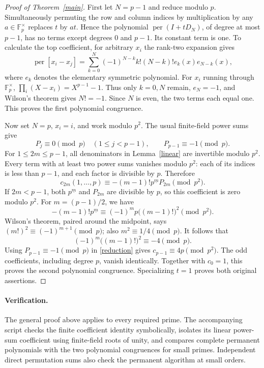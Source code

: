 \documentclass[10pt]{article}
\newcommand{\per}{\operatorname{per}}
\newcommand{\fall}[2]{#1^{\underline{#2}}}
\begin{document}
\begin{proof}[Proof of Theorem~\ref{main}]
First let \(N=p-1\) and reduce modulo \(p\).
Simultaneously permuting the row and column indices by multiplication
by any \(a\in\mathbb F_p^\times\) replaces \(t\) by \(at\).
Hence the polynomial \(\per(I+tD_N)\), of degree at most \(p-1\),
has no terms except degrees \(0\) and \(p-1\).
Its constant term is one. To calculate the top coefficient, for
arbitrary \(x_i\) the rank-two expansion gives
\[
 \per[x_i-x_j]=\sum_{k=0}^N
 (-1)^{N-k}k!(N-k)!e_k(x)e_{N-k}(x),
\]
where \(e_k\) denotes the elementary symmetric polynomial.
For \(x_i\) running through \(\mathbb F_p^\times\),
\(\prod_i(X-x_i)=X^{p-1}-1\). Thus only \(k=0,N\) remain,
\(e_N=-1\), and Wilson's theorem gives \(N!=-1\).
Since \(N\) is even, the two terms each equal one. This proves
the first polynomial congruence.

Now set \(N=p\), \(x_i=i\), and work modulo \(p^2\).
The usual finite-field power sums give
\[
 P_j\equiv0\pmod p\quad(1\le j<p-1),\qquad
 P_{p-1}\equiv-1\pmod p.
\]
For \(1\le2m\le p-1\), all denominators in Lemma~\ref{linear}
are invertible modulo \(p^2\). Every term with at least two power
sums vanishes modulo \(p^2\): each of its indices is less than
\(p-1\), and each factor is divisible by \(p\). Therefore
\begin{equation}\label{reduction}
 c_{2m}(1,\ldots,p)\equiv-(m-1)!\fall{p}{m}P_{2m}
 \pmod{p^2}.
\end{equation}
If \(2m<p-1\), both \(\fall p m\) and \(P_{2m}\) are divisible
by \(p\), so this coefficient is zero modulo \(p^2\).
For \(m=(p-1)/2\), we have
\[
 -(m-1)!\fall p m
 \equiv(-1)^m p\bigl((m-1)!\bigr)^2\pmod{p^2}.
\]
Wilson's theorem, paired around the midpoint, says
\((m!)^2\equiv(-1)^{m+1}\pmod p\); also
\(m^2\equiv1/4\pmod p\). It follows that
\[
 (-1)^m\bigl((m-1)!\bigr)^2\equiv-4\pmod p.
\]
Using \(P_{p-1}\equiv-1\pmod p\) in \eqref{reduction} gives
\(c_{p-1}\equiv4p\pmod{p^2}\).
The odd coefficients, including degree \(p\), vanish identically.
Together with \(c_0=1\), this proves the second polynomial
congruence. Specializing \(t=1\) proves both original assertions.
\end{proof}

\paragraph{Verification.}
The general proof above applies to every required prime. The accompanying
script checks the finite coefficient identity symbolically, isolates its
linear power-sum coefficient using finite-field roots of unity, and
compares complete permanent polynomials with the two polynomial
congruences for small primes. Independent direct permutation sums
also check the permanent algorithm at small orders.
\end{document}
